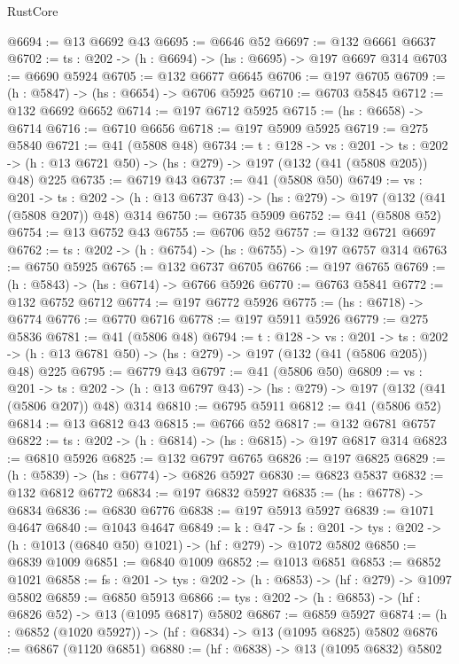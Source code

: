 \begin{lexlean}{RustCore}
\begin{coremodule}
@6694 := @13 @6692 @43
@6695 := @6646 @52
@6697 := @132 @6661 @6637
@6702 := {ts : @202} -> (h : @6694) -> (hs : @6695) -> @197 @6697 @314
@6703 := @6690 @5924
@6705 := @132 @6677 @6645
@6706 := @197 @6705
@6709 := (h : @5847) -> (hs : @6654) -> @6706 @5925
@6710 := @6703 @5845
@6712 := @132 @6692 @6652
@6714 := @197 @6712 @5925
@6715 := (hs : @6658) -> @6714
@6716 := @6710 @6656
@6718 := @197 @5909 @5925
@6719 := @275 @5840
@6721 := @41 (@5808 @48)
@6734 := {t : @128} ->
  {vs : @201} ->
  {ts : @202} -> (h : @13 @6721 @50) -> (hs : @279) -> @197 (@132 (@41 (@5808 @205)) @48) @225
@6735 := @6719 @43
@6737 := @41 (@5808 @50)
@6749 := {vs : @201} ->
  {ts : @202} -> (h : @13 @6737 @43) -> (hs : @279) -> @197 (@132 (@41 (@5808 @207)) @48) @314
@6750 := @6735 @5909
@6752 := @41 (@5808 @52)
@6754 := @13 @6752 @43
@6755 := @6706 @52
@6757 := @132 @6721 @6697
@6762 := {ts : @202} -> (h : @6754) -> (hs : @6755) -> @197 @6757 @314
@6763 := @6750 @5925
@6765 := @132 @6737 @6705
@6766 := @197 @6765
@6769 := (h : @5843) -> (hs : @6714) -> @6766 @5926
@6770 := @6763 @5841
@6772 := @132 @6752 @6712
@6774 := @197 @6772 @5926
@6775 := (hs : @6718) -> @6774
@6776 := @6770 @6716
@6778 := @197 @5911 @5926
@6779 := @275 @5836
@6781 := @41 (@5806 @48)
@6794 := {t : @128} ->
  {vs : @201} ->
  {ts : @202} -> (h : @13 @6781 @50) -> (hs : @279) -> @197 (@132 (@41 (@5806 @205)) @48) @225
@6795 := @6779 @43
@6797 := @41 (@5806 @50)
@6809 := {vs : @201} ->
  {ts : @202} -> (h : @13 @6797 @43) -> (hs : @279) -> @197 (@132 (@41 (@5806 @207)) @48) @314
@6810 := @6795 @5911
@6812 := @41 (@5806 @52)
@6814 := @13 @6812 @43
@6815 := @6766 @52
@6817 := @132 @6781 @6757
@6822 := {ts : @202} -> (h : @6814) -> (hs : @6815) -> @197 @6817 @314
@6823 := @6810 @5926
@6825 := @132 @6797 @6765
@6826 := @197 @6825
@6829 := (h : @5839) -> (hs : @6774) -> @6826 @5927
@6830 := @6823 @5837
@6832 := @132 @6812 @6772
@6834 := @197 @6832 @5927
@6835 := (hs : @6778) -> @6834
@6836 := @6830 @6776
@6838 := @197 @5913 @5927
@6839 := @1071 @4647
@6840 := @1043 @4647
@6849 := {k : @47} ->
  {fs : @201} -> {tys : @202} -> (h : @1013 (@6840 @50) @1021) -> (hf : @279) -> @1072 @5802
@6850 := @6839 @1009
@6851 := @6840 @1009
@6852 := @1013 @6851
@6853 := @6852 @1021
@6858 := {fs : @201} -> {tys : @202} -> (h : @6853) -> (hf : @279) -> @1097 @5802
@6859 := @6850 @5913
@6866 := {tys : @202} -> (h : @6853) -> (hf : @6826 @52) -> @13 (@1095 @6817) @5802
@6867 := @6859 @5927
@6874 := (h : @6852 (@1020 @5927)) -> (hf : @6834) -> @13 (@1095 @6825) @5802
@6876 := @6867 (@1120 @6851)
@6880 := (hf : @6838) -> @13 (@1095 @6832) @5802

\end{coremodule}
\end{lexlean}
